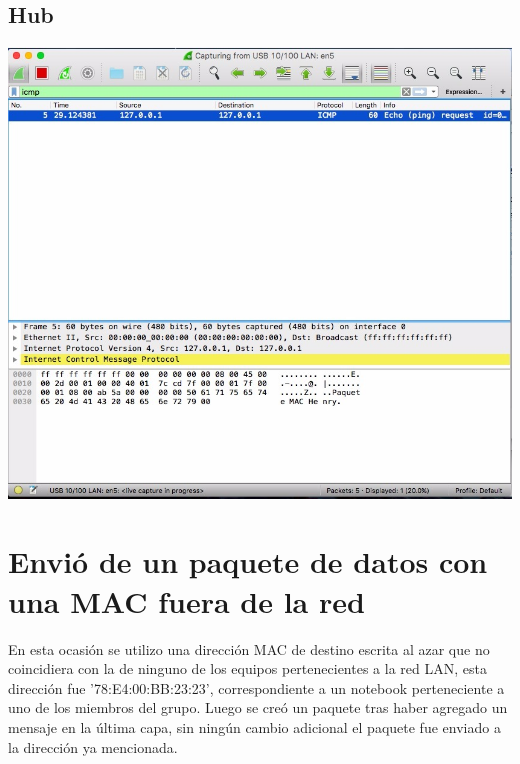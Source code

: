 \documentclass[spanish]{udpreport}
\begin{document}
\subsection{Hub}

\begin{center}
	\includegraphics[scale=.37]{imagenes/Hub/Test_2_Wireshark_a.jpg}
\end{center}
\newpage
\section{Envió de un paquete de datos con una MAC fuera de la red}

En esta ocasión se utilizo una dirección MAC de destino escrita al azar que no coincidiera con la de ninguno de los equipos pertenecientes a la red LAN, esta dirección fue ’78:E4:00:BB:23:23’, correspondiente a un notebook perteneciente a uno de los miembros del grupo. Luego se creó un paquete tras haber agregado un mensaje en la última capa, sin ningún cambio adicional el paquete fue enviado a la dirección ya mencionada.

\end{document}
